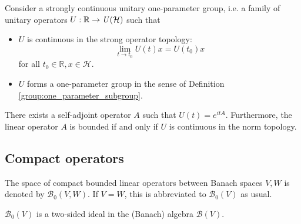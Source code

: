     \begin{theorem}[Stone]\label{operator:stone}
        Consider a strongly continuous unitary one-parameter group, i.e. a family of unitary operators $U:\mathbb{R}\rightarrow\text{\emph{U}}(\mathcal{H})$ such that
        \begin{itemize}
            \item $U$ is continuous in the strong operator topology: \[\lim_{t\rightarrow t_0}U(t)x=U(t_0)x\] for all $t_0\in\mathbb{R}, x\in\mathcal{H}$.
            \item $U$ forms a one-parameter group in the sense of Definition \ref{group:one_parameter_subgroup}.
        \end{itemize}
        There exists a self-adjoint operator $A$ such that $U(t)=e^{itA}$. Furthermore, the linear operator $A$ is bounded if and only if $U$ is continuous in the norm topology.
    \end{theorem}

\subsection{Compact operators}



    \begin{notation}
        The space of compact bounded linear operators between Banach spaces $V,W$ is denoted by $\mathcal{B}_0(V,W)$. If $V=W$, this is abbreviated to $\mathcal{B}_0(V)$ as usual.
    \end{notation}
    \begin{property}
        $\mathcal{B}_0(V)$ is a two-sided ideal in the (Banach) algebra $\mathcal{B}(V)$.
    \end{property}

